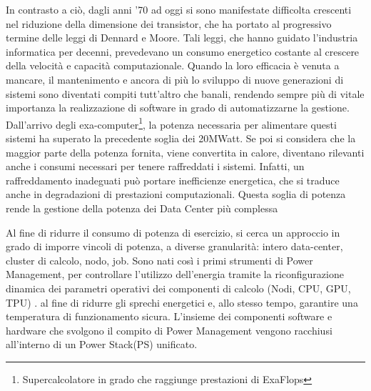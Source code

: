 In contrasto a ciò, dagli anni '70 ad oggi si sono manifestate difficolta crescenti nel riduzione della dimensione dei transistor, che ha portato al progressivo termine delle leggi di Dennard e Moore\cite{Dennardsscaling}\cite{Dennardsscaling2}. Tali leggi, che hanno guidato l'industria informatica per decenni, prevedevano un consumo energetico costante al crescere della velocità e capacità computazionale. Quando la loro efficacia è venuta a mancare, il mantenimento e ancora di più lo sviluppo di nuove generazioni di sistemi sono diventati compiti tutt'altro che banali\cite{growth}, rendendo sempre più di vitale importanza la realizzazione di software in grado di automatizzarne la gestione.
Dall'arrivo degli exa-computer\footnote{Supercalcolatore in grado che raggiunge prestazioni di ExaFlops}, la potenza necessaria per alimentare questi sistemi ha superato la precedente soglia dei 20MWatt\cite{TOP500}. Se poi si considera che la maggior parte della potenza fornita, viene convertita in calore, diventano rilevanti anche i consumi necessari per tenere raffreddati i sistemi. Infatti, un raffreddamento inadeguati può portare inefficienze energetica, che si traduce anche in degradazioni di prestazioni computazionali. %
Questa soglia di potenza rende la gestione della potenza dei Data Center più complessa %

Al fine di ridurre il consumo di potenza di esercizio, si cerca un approccio in grado di imporre vincoli di potenza, 
a diverse granularità: intero data-center, cluster di calcolo, nodo, job. 
Sono nati così i primi strumenti di Power Management, per controllare l'utilizzo dell'energia tramite la riconfigurazione dinamica dei parametri operativi dei componenti di calcolo (Nodi, CPU, GPU, TPU) .
al fine di ridurre gli sprechi energetici e, allo stesso tempo, garantire una temperatura di funzionamento sicura. %
L'insieme dei componenti software e hardware che svolgono il compito di Power Management vengono racchiusi all'interno di un Power Stack(PS) unificato. %


